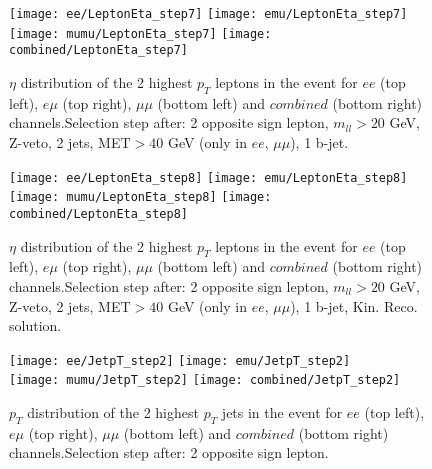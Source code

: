 \begin{figure}
  \texttt{[image: ee/LeptonEta\_step7]}
  \texttt{[image: emu/LeptonEta\_step7]}\\
  \texttt{[image: mumu/LeptonEta\_step7]}
  \texttt{[image: combined/LeptonEta\_step7]}
\caption{$\eta$ distribution of the 2 highest $p_T$ leptons in the event for $ee$ (top left), $e\mu$ (top right), $\mu\mu$ (bottom left) and $combined$ (bottom right) channels.\newline Selection step after: 2 opposite sign lepton, $m_{ll}>20$ GeV, Z-veto, 2 jets, MET$>40$ GeV (only in $ee$, $\mu\mu$), 1 b-jet.}
\end{figure}

\clearpage
\newpage


\begin{figure}
  \texttt{[image: ee/LeptonEta\_step8]}
  \texttt{[image: emu/LeptonEta\_step8]}\\
  \texttt{[image: mumu/LeptonEta\_step8]}
  \texttt{[image: combined/LeptonEta\_step8]}
\caption{$\eta$ distribution of the 2 highest $p_T$ leptons in the event for $ee$ (top left), $e\mu$ (top right), $\mu\mu$ (bottom left) and $combined$ (bottom right) channels.\newline Selection step after: 2 opposite sign lepton, $m_{ll}>20$ GeV, Z-veto, 2 jets, MET$>40$ GeV (only in $ee$, $\mu\mu$), 1 b-jet, Kin. Reco. solution.}
\end{figure}

\clearpage
\newpage





\begin{figure}
  \texttt{[image: ee/JetpT\_step2]}
  \texttt{[image: emu/JetpT\_step2]}\\
  \texttt{[image: mumu/JetpT\_step2]}
  \texttt{[image: combined/JetpT\_step2]}
\caption{$p_T$ distribution of the 2 highest $p_T$ jets in the event for $ee$ (top left), $e\mu$ (top right), $\mu\mu$ (bottom left) and $combined$ (bottom right) channels.\newline Selection step after: 2 opposite sign lepton.}
\end{figure}

